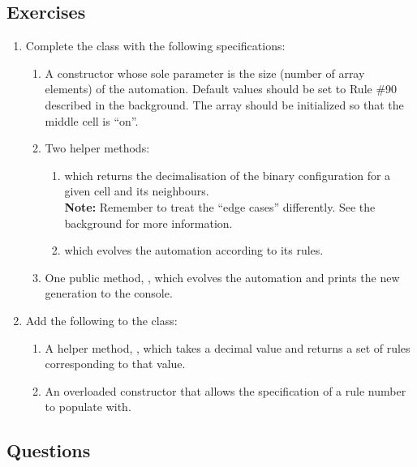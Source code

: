 	  \subsection{Exercises}
	    \begin{enumerate}
	      \item Complete the  class with the following specifications:
	        \begin{enumerate}
	          \item A constructor whose sole parameter is the size (number of array elements) of the automation. Default  values should be set to Rule \#90 described in the background. The  array should be initialized so that the middle cell is ``on''.
	          \item Two helper methods:
	          \begin{enumerate}
	            \item {} which returns the decimalisation of the binary configuration for a given cell and its neighbours.\\
							{\small\textbf{Note:} Remember to treat the ``edge cases'' differently. See the background for more information.}
	            \item {} which evolves the automation according to its rules.
	          \end{enumerate}
	          \item One public method, , which evolves the automation and prints the new generation to the console.
	        \end{enumerate}

	      \item Add the following to the  class:
	        \begin{enumerate}
	          \item A helper method, , which takes a decimal  value and returns a set of rules corresponding to that value.
	          \item An overloaded constructor that allows the specification of a rule number to populate  with.
	        \end{enumerate}
	    \end{enumerate}

    \subsection{Questions}
      \ \\[9pt]


